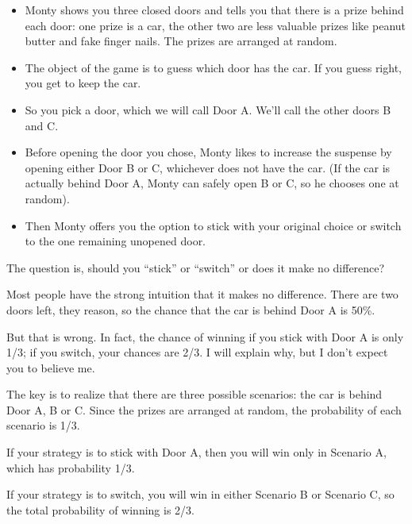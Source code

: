 \documentclass[12pt]{book}
\begin{document}
\begin{itemize}

\item Monty shows you three closed doors and tells you that there is a
  prize behind each door: one prize is a car, the other two are less
  valuable prizes like peanut butter and fake finger nails.  The
  prizes are arranged at random.

\item The object of the game is to guess which door has the car.  If
  you guess right, you get to keep the car.

\item So you pick a door, which we will call Door A.  We'll call the
  other doors B and C.

\item Before opening the door you chose, Monty likes to increase the
  suspense by opening either Door B or C, whichever does not
  have the car.  (If the car is actually behind Door A, Monty can
  safely open B or C, so he chooses one at random).

\item Then Monty offers you the option to stick with your original
  choice or switch to the one remaining unopened door.

\end{itemize}

The question is, should you ``stick'' or ``switch'' or does it
make no difference?

Most people have the strong intuition that it makes no difference.
There are two doors left, they reason, so the chance that the car
is behind Door A is 50\%.

But that is wrong.  In fact, the chance of winning if you stick
with Door A is only 1/3; if you switch, your chances are 2/3.
I will explain why, but I don't expect you to believe me.

The key is to realize that there are three possible scenarios:
the car is behind Door A, B or C.  Since the prizes are
arranged at random, the probability of each scenario is 1/3.

If your strategy is to stick with Door A, then you will
win only in Scenario A, which has probability 1/3.

If your strategy is to switch, you will win in either Scenario
B or Scenario C, so the total probability of winning is 2/3.

\end{document}
